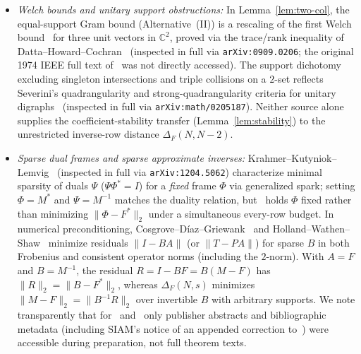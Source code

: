 \documentclass[11pt,reqno]{amsart}
\numberwithin{equation}{section}
\theoremstyle{definition}
\theoremstyle{remark}
\newcommand{\C}{\mathbb{C}}
\begin{document}
\begin{itemize}[leftmargin=1.5em]
\item \emph{Welch bounds and unitary support obstructions:} In Lemma~\ref{lem:two-col}, the equal-support Gram bound (Alternative~(II)) is a rescaling of the first Welch bound~\cite{Wel74} for three unit vectors in $\C^2$, proved via the trace/rank inequality of Datta--Howard--Cochran~\cite[Lemma~2.1 and Theorem~2.2]{DHC12} (inspected in full via \texttt{arXiv:0909.0206}; the original 1974 IEEE full text of~\cite{Wel74} was not directly accessed). The support dichotomy excluding singleton intersections and triple collisions on a $2$-set reflects Severini's quadrangularity and strong-quadrangularity criteria for unitary digraphs~\cite[Definitions~1--2 and Lemma~1]{Sev03} (inspected in full via \texttt{arXiv:math/0205187}). Neither source alone supplies the coefficient-stability transfer (Lemma~\ref{lem:stability}) to the unrestricted inverse-row distance $\Delta_F(N,N-2)$.
\item \emph{Sparse dual frames and sparse approximate inverses:} Krahmer--Kutyniok--Lemvig~\cite[Eq.~(2.3), Theorem~3.2, and Proposition~3.3]{KKL13} (inspected in full via \texttt{arXiv:1204.5062}) characterize minimal sparsity of duals $\Psi$ ($\Psi\Phi^*=I$) for a \emph{fixed} frame $\Phi$ via generalized spark; setting $\Phi=M^*$ and $\Psi=M^{-1}$ matches the duality relation, but~\cite{KKL13} holds $\Phi$ fixed rather than minimizing $\|\Phi-F^*\|_2$ under a simultaneous every-row budget. In numerical preconditioning, Cosgrove--D\'iaz--Griewank~\cite{CDG92} and Holland--Wathen--Shaw~\cite{HWS05} minimize residuals $\|I - BA\|$ (or $\|T-PA\|$) for sparse $B$ in both Frobenius and consistent operator norms (including the $2$-norm). With $A=F$ and $B=M^{-1}$, the residual $R=I-BF=B(M-F)$ has $\|R\|_2=\|B-F^*\|_2$, whereas $\Delta_F(N,s)$ minimizes $\|M-F\|_2=\|B^{-1}R\|_2$ over invertible $B$ with arbitrary supports. We note transparently that for~\cite{CDG92} and~\cite{HWS05} only publisher abstracts and bibliographic metadata (including SIAM's notice of an appended correction to~\cite{HWS05}) were accessible during preparation, not full theorem texts.
\end{itemize}
\end{document}
